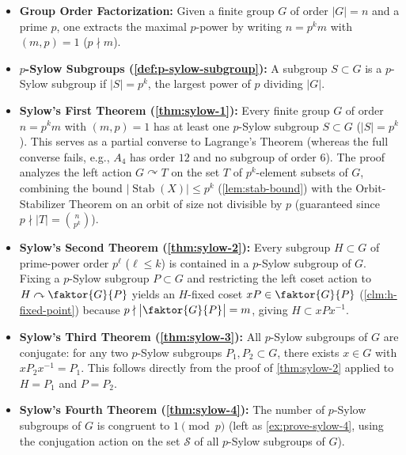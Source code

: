 \begin{overview}
\begin{itemize}
    \item \textbf{Group Order Factorization:} Given a finite group $G$ of order $|G| = n$ and a prime $p$, one extracts the maximal $p$-power by writing $n = p^k m$ with $(m, p) = 1$ ($p \nmid m$).
    \item \textbf{$p$-Sylow Subgroups (\cref{def:p-sylow-subgroup}):} A subgroup $S \subset G$ is a $p$-Sylow subgroup if $|S| = p^k$, the largest power of $p$ dividing $|G|$.
    \item \textbf{Sylow's First Theorem (\cref{thm:sylow-1}):} Every finite group $G$ of order $n = p^k m$ with $(m, p) = 1$ has at least one $p$-Sylow subgroup $S \subset G$ ($|S| = p^k$). This serves as a partial converse to Lagrange's Theorem (whereas the full converse fails, e.g., $A_4$ has order $12$ and no subgroup of order $6$). The proof analyzes the left action $G \curvearrowright T$ on the set $T$ of $p^k$-element subsets of $G$, combining the bound $|\operatorname{Stab}(X)| \le p^k$ (\cref{lem:stab-bound}) with the Orbit-Stabilizer Theorem on an orbit of size not divisible by $p$ (guaranteed since $p \nmid |T| = \binom{n}{p^k}$).
    \item \textbf{Sylow's Second Theorem (\cref{thm:sylow-2}):} Every subgroup $H \subset G$ of prime-power order $p^\ell$ ($\ell \le k$) is contained in a $p$-Sylow subgroup of $G$. Fixing a $p$-Sylow subgroup $P \subset G$ and restricting the left coset action to $H \curvearrowright \faktor{G}{P}$ yields an $H$-fixed coset $x P \in \faktor{G}{P}$ (\cref{clm:h-fixed-point}) because $p \nmid \bigl|\faktor{G}{P}\bigr| = m$, giving $H \subset x P x^{-1}$.
    \item \textbf{Sylow's Third Theorem (\cref{thm:sylow-3}):} All $p$-Sylow subgroups of $G$ are conjugate: for any two $p$-Sylow subgroups $P_1, P_2 \subset G$, there exists $x \in G$ with $x P_2 x^{-1} = P_1$. This follows directly from the proof of \cref{thm:sylow-2} applied to $H = P_1$ and $P = P_2$.
    \item \textbf{Sylow's Fourth Theorem (\cref{thm:sylow-4}):} The number of $p$-Sylow subgroups of $G$ is congruent to $1 \pmod p$ (left as \cref{ex:prove-sylow-4}, using the conjugation action on the set $\mathcal{S}$ of all $p$-Sylow subgroups of $G$).
\end{itemize}
\end{overview}